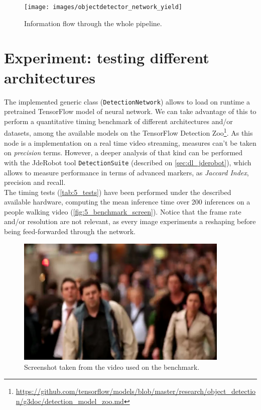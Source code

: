 		\begin{figure}[h!]
			\centering
			\texttt{[image: images/objectdetector\_network\_yield]}
			\caption{Information flow through the whole pipeline.}
			\label{fig:5_whole_pipeline}
		\end{figure}

\vspace{3.5in}
\section{Experiment: testing different architectures}
	The implemented generic class (\texttt{DetectionNetwork}) allows to load on runtime a pretrained TensorFlow model of neural network. We can take advantage of this to perform a quantitative timing benchmark of different architectures and/or datasets, among the available models on the TensorFlow Detection Zoo\footnote{\url{https://github.com/tensorflow/models/blob/master/research/object_detection/g3doc/detection_model_zoo.md}}. As this node is a implementation on a real time video streaming, measures can't be taken on \emph{precision} terms. However, a deeper analysis of that kind can be performed with the JdeRobot tool \texttt{DetectionSuite} (described on \autoref{sec:dl_jderobot}), which allows to measure performance in terms of advanced markers, as \emph{Jaccard Index}, precision and recall.\\
	
	The timing tests (\autoref{tab:5_tests}) have been performed under the described available hardware, computing the mean inference time over 200 inferences on a people walking video (\autoref{fig:5_benchmark_screen}). Notice that the frame rate and/or resolution are not relevant, as every image experiments a reshaping before being feed-forwarded through the network.
	
	\begin{figure}[h]
		\centering
		\includegraphics[width=4in]{images/net_benchmarking_screenshot}
		\caption{Screenshot taken from the video used on the benchmark.}
		\label{fig:5_benchmark_screen}
	\end{figure}
	
